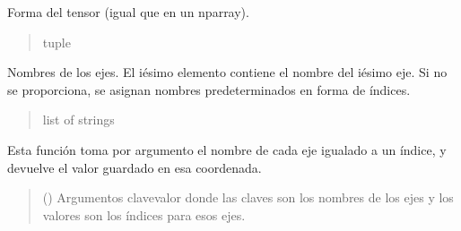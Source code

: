 \documentclass[letterpaper,10pt,english]{sphinxmanual}
\begin{document}
\begin{fulllineitems}
\begin{fulllineitems}
\begin{quote}
\begin{description}
\end{description}\end{quote}

\end{fulllineitems}


\begin{fulllineitems}
\label{\detokenize{myutils:myutils.tensor.Tensor.shape}}
\pysigstartsignatures
{}
\pysigstopsignatures
\sphinxAtStartPar
Forma del tensor (igual que en un nparray).
\begin{quote}\begin{description}
\sphinxAtStartPar
tuple

\end{description}\end{quote}

\end{fulllineitems}


\begin{fulllineitems}
\label{\detokenize{myutils:myutils.tensor.Tensor.axis}}
\pysigstartsignatures
{}
\pysigstopsignatures
\sphinxAtStartPar
Nombres de los ejes. El i\sphinxhyphen{}ésimo elemento contiene el nombre del i\sphinxhyphen{}ésimo eje.
Si no se proporciona, se asignan nombres predeterminados en forma de índices.
\begin{quote}\begin{description}
\sphinxAtStartPar
list of strings

\end{description}\end{quote}

\end{fulllineitems}


\begin{fulllineitems}
\label{\detokenize{myutils:myutils.tensor.Tensor.item}}
\pysigstartsignatures
{}
\pysigstopsignatures
\sphinxAtStartPar
Esta función toma por argumento el nombre de cada eje igualado a un
índice, y devuelve el valor guardado en esa coordenada.
\begin{quote}\begin{description}
\sphinxAtStartPar
{} () \textendash{} Argumentos clave\sphinxhyphen{}valor donde las claves son los nombres de los ejes y
los valores son los índices para esos ejes.


\end{description}
\end{quote}
\end{fulllineitems}
\end{fulllineitems}
\end{document}
